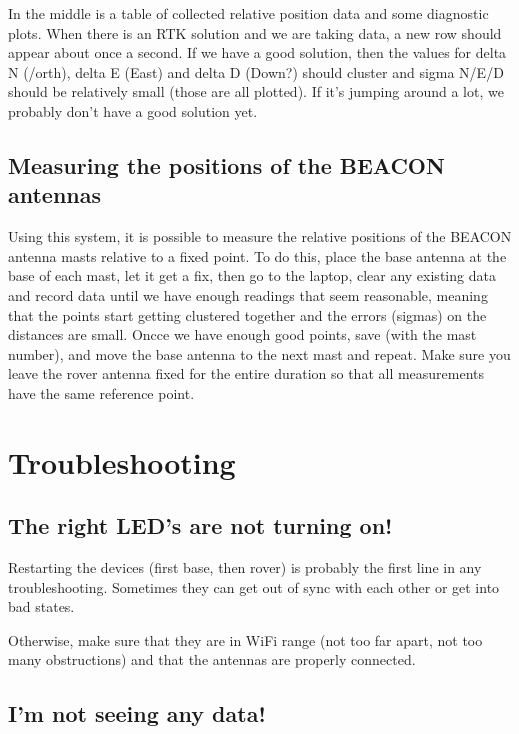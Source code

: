 \documentclass[usletter]{article}
\begin{document}
In the middle is a table of collected relative position data and some diagnostic plots. When there is an RTK solution and we are taking data, a new row should appear about once a second. If we have a good solution, then the values for delta N (/orth), delta E (East) and delta D (Down?) should cluster and sigma N/E/D should be relatively small (those are all plotted). If it's jumping around a lot, we probably don't have a good solution yet. 

\subsection{Measuring the positions of the BEACON antennas} 

Using this system, it is possible to measure the relative positions of the BEACON antenna masts relative to a fixed point. To do this, place the base antenna at the base of each mast, let it get a fix, then go to the laptop, clear any existing data and record data until we have enough readings that seem reasonable, meaning  that the points start getting clustered together and the errors (sigmas) on the distances are small. Oncce we have enough good points, save (with the mast number), and move the base antenna to the next mast and repeat. Make sure you leave the rover antenna fixed for the entire duration so that all measurements have the same reference point. 

\section{Troubleshooting} 

\subsection{The right LED's are not turning on!} 

Restarting the devices (first base, then rover) is probably the first line in any troubleshooting. Sometimes they can get out of sync with each other or get into bad states. 

Otherwise, make sure that they are in WiFi range (not too far apart, not too many obstructions) and that the antennas are properly connected. 

\subsection{I'm not seeing any data!}
\end{document}
